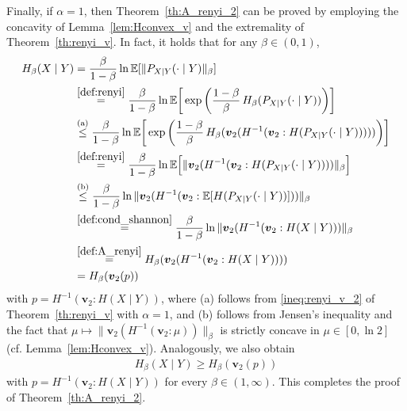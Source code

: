 \documentclass[conference, draftcls, onecolumn]{IEEEtran}
\theoremstyle{plain}
\newcommand{\bvec}[1]{\boldsymbol{#1}}
\newcommand{\lemref}[1]{Lemma~\ref{#1}}
\newcommand{\thref}[1]{Theorem~\ref{#1}}
\begin{document}
\begin{IEEEproof}[Proof of \thref{th:A_renyi_2}]
Finally, if $\alpha = 1$, then \thref{th:A_renyi_2} can be proved by employing the concavity of \lemref{lem:Hconvex_v} and the extremality of \thref{th:renyi_v}.
In fact, it holds that for any $\beta \in (0, 1)$,
\begin{align}
H_{\beta}(X \mid Y)
& =
\frac{ \beta }{ 1 - \beta } \ln \mathbb{E}[ \| P_{X|Y}(\cdot \mid Y) \|_{\beta} ]
\\
& \overset{\eqref{def:renyi}}{=}
\frac{ \beta }{ 1 - \beta } \ln \mathbb{E}\bigg[ \exp\bigg( \frac{ 1 - \beta }{ \beta } \, H_{\beta}( P_{X|Y}(\cdot \mid Y) ) \bigg) \bigg]
\\
& \overset{\text{(a)}}{\le}
\frac{ \beta }{ 1 - \beta } \ln \mathbb{E}\bigg[ \exp\bigg( \frac{ 1 - \beta }{ \beta } \, H_{\beta}( \bvec{v}_{2}( H^{-1}( \bvec{v}_{2} : H( P_{X|Y}(\cdot \mid Y) ) ) ) ) \bigg) \bigg]
\\
& \overset{\eqref{def:renyi}}{=}
\frac{ \beta }{ 1 - \beta } \ln \mathbb{E}\Big[ \| \bvec{v}_{2}( H^{-1}( \bvec{v}_{2} : H( P_{X|Y}(\cdot \mid Y) ) ) ) \|_{\beta} \Big]
\\
& \overset{\text{(b)}}{\le}
\frac{ \beta }{ 1 - \beta } \ln \| \bvec{v}_{2}( H^{-1}( \bvec{v}_{2} : \mathbb{E}[ H( P_{X|Y}(\cdot \mid Y) ) ] ) ) \|_{\beta}
\\
& \overset{\eqref{def:cond_shannon}}{=}
\frac{ \beta }{ 1 - \beta } \ln \| \bvec{v}_{2}( H^{-1}( \bvec{v}_{2} : H(X \mid Y) ) ) \|_{\beta}
\\
& \overset{\eqref{def:A_renyi}}{=}
H_{\beta}( \bvec{v}_{2}( H^{-1}( \bvec{v}_{2} : H(X \mid Y) ) ) )
\\
& =
H_{\beta}( \bvec{v}_{2}( p ) )
\end{align}
with $p = H^{-1}(\bvec{v}_{2} : H(X \mid Y) )$, where (a) follows from \eqref{ineq:renyi_v_2} of \thref{th:renyi_v} with $\alpha = 1$, and (b) follows from Jensen's inequality and the fact that $\mu \mapsto \| \bvec{v}_{2}( H^{-1}( \bvec{v}_{2} : \mu ) ) \|_{\beta}$ is strictly concave in $\mu \in [0, \ln 2]$ (cf. \lemref{lem:Hconvex_v}).
Analogously, we also obtain
\begin{align}
H_{\beta}(X \mid Y)
\ge
H_{\beta}( \bvec{v}_{2}( p ) )
\end{align}
with $p = H^{-1}(\bvec{v}_{2} : H(X \mid Y) )$ for every $\beta \in (1, \infty)$.
This completes the proof of \thref{th:A_renyi_2}.
\end{IEEEproof}
\end{document}
